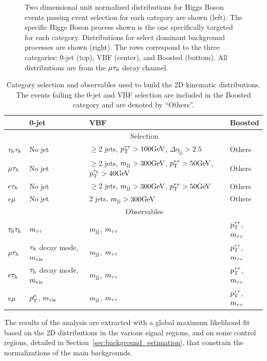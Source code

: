 \begin{figure}[htbp]
     \caption{Two dimensional unit normalized distributions for Higgs Boson events passing event selection 
for each category are shown (left). The specific Higgs Boson process shown is the one 
specifically targeted for each category. Distributions for select dominant background 
processes are shown (right). The rows correspond to the three categories: 0-jet (top), 
VBF (center), and Boosted (bottom).  All distributions are from the $\mu\tau_{h}$ decay channel.} 
\end{figure}


\begin{table}
\centering
\begin{small}
\begin{tabular}{llll}
 & 0-jet & VBF & Boosted \\
\hline
 & \multicolumn{3}{c}{Selection} \\ \cline{2-4}
$\tau_{h}\tau_{h}$ & No jet &  \scriptsize{$\geq$2 jets, $p_\mathrm{T}^{\tau\tau}>100\mathrm{GeV}$, $\Delta\eta_{\mathrm{jj}}>2.5$} & Others\\
$\mu\tau_{h}$ & No jet &  \scriptsize{$\geq$2 jets, $m_\mathrm{jj}>300\mathrm{GeV}$, $p_\mathrm{T}^{\tau\tau}>50\mathrm{GeV}$, $p_\mathrm{T}^{\tau_{h}}>40\mathrm{GeV}$} & Others\\
$e\tau_{h}$ & No jet &  \scriptsize{$\geq$2 jets, $m_\mathrm{jj}>300\mathrm{GeV}$, $p_\mathrm{T}^{\tau\tau}>50\mathrm{GeV}$} & Others\\
$e\mu$ & No jet & \scriptsize{2 jets, $m_\mathrm{jj}>300\mathrm{GeV}$} & Others \\
\hline
 & \multicolumn{3}{c}{Observables}\\ \cline{2-4}
$\tau_{h}\tau_{h}$ & $m_{\tau\tau}$                 &    $m_\mathrm{jj}$, $m_{\tau\tau}$  &   $p_\mathrm{T}^{\tau\tau}$, $m_{\tau\tau}$  \\
$\mu\tau_{h}$ & $\tau_{h}$ decay mode, $m_\text{vis}$   &    $m_\mathrm{jj}$, $m_{\tau\tau}$  &  $p_\mathrm{T}^{\tau\tau}$, $m_{\tau\tau}$  \\
$e\tau_{h}$ & $\tau_{h}$ decay mode, $m_\text{vis}$   &    $m_\mathrm{jj}$, $m_{\tau\tau}$  &  $p_\mathrm{T}^{\tau\tau}$, $m_{\tau\tau}$ \\
$e\mu$ & $p_\mathrm{T}^{\mu}$, $m_\text{vis}$   &     $m_\mathrm{jj}$, $m_{\tau\tau}$  &   $p_\mathrm{T}^{\tau\tau}$, $m_{\tau\tau}$  \\
\hline
\end{tabular}
\caption{ Category selection and observables used to build the 2D kinematic distributions. 
The events failing the 0-jet and VBF selection are included in the Boosted category and are
denoted by ``Others''.
\label{tab:htt_categories}
}
\end{small}
\end{table}

The results of the analysis are extracted with a global maximum likelihood fit based on  the 2D distributions in the various signal regions, and on some control regions, detailed in Section~\ref{sec:background_estimation}, that constrain the normalizations of the main backgrounds.

